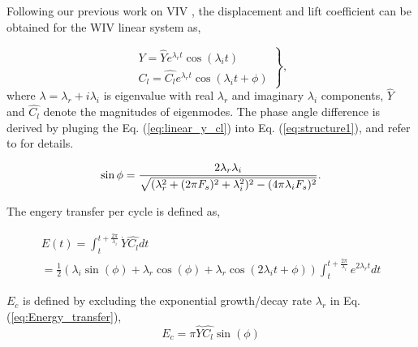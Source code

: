 Following our previous work on VIV \cite{yao_jfm_1}, 
the displacement and lift coefficient can be obtained  for the WIV linear system as, 
 
\begin{equation}
\left. \begin{array}{ll}
\displaystyle Y=\hat{Y} e^{\lambda_r t}\cos(\lambda_i t)  \\[8pt]
\displaystyle C_l=\hat{C_l} e^{\lambda_r t}\cos(\lambda_i t + \phi)
\end{array}\right\},
\label{eq:linear_y_cl}
\end{equation}
where $\lambda=\lambda_r+i\lambda_i$ is eigenvalue with real $\lambda_r$ 
and imaginary $\lambda_i$ components, $\hat{Y}$ and $\hat{C_l}$ 
denote the magnitudes of eigenmodes. The phase angle difference is derived 
by pluging the Eq. (\ref{eq:linear_y_cl}) into Eq. (\ref{eq:structure1}), and refer
to \cite{yao_jfm_1} for details. 

\begin{equation}
\sin{\phi} = \frac{2\lambda_r\lambda_i}{\sqrt{(\lambda_r^2  \\
+ (2\pi F_s)^2 + \lambda_i^2)^2 - (4\pi\lambda_i F_s)^2 }}.
\label{eq:phase_angle}
\end{equation}

The engery transfer per cycle is defined as,

\begin{equation}
\begin{array}{ll}
\displaystyle E(t) = \int_{t}^{t+\frac{2 \pi}{\lambda_i}} \dot{Y} \hat{C_l} dt \\
\displaystyle  = \frac{1}{2}(\lambda_i \sin(\phi) + \lambda_r \cos(\phi) + \lambda_r \cos(2 \lambda_i t + \phi))
\int_{t}^{t+\frac{2 \pi}{\lambda_i}} e^{2 \lambda_r t} dt
\end{array}
\label{eq:Energy_transfer}
\end{equation}

$E_c$ is defined by excluding the exponential growth/decay rate $\lambda_r$ in Eq. (\ref{eq:Energy_transfer}),
\begin{equation}
E_c = \pi \hat{Y} \hat{C_l} \sin(\phi)
\end{equation}




